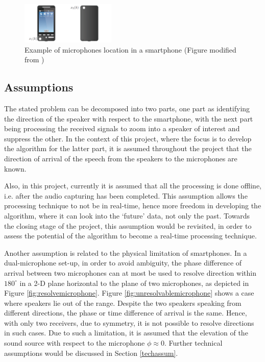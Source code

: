 \documentclass[a4paper,twoside,12pt,hidelinks]{article}
\begin{document}
\begin{figure}[H]
\centering
\includegraphics[width=0.4\textwidth]{mobilephone}
\caption{Example of microphones location in a smartphone (Figure modified from \cite{Jeub2012NoiseDifferences})}
\label{fig:mobilephone}
\end{figure}

\subsection{Assumptions}
The stated problem can be decomposed into two parts, one part as identifying the direction of the speaker with respect to the smartphone, with the next part being processing the received signals to zoom into a speaker of interest and suppress the other. In the context of this project, where the focus is to develop the algorithm for the latter part, it is assumed throughout the project that the direction of arrival of the speech from the speakers to the microphones are known.

Also, in this project, currently it is assumed that all the processing is done offline, i.e. after the audio capturing has been completed. This assumption allows the processing technique to not be in real-time, hence more freedom in developing the algorithm, where it can look into the `future' data, not only the past. Towards the closing stage of the project, this assumption would be revisited, in order to assess the potential of the algorithm to become a real-time processing technique.

Another assumption is related to the physical limitation of smartphones. In a dual-microphone set-up, in order to avoid ambiguity, the phase difference of arrival between two microphones can at most be used to resolve direction within $180^{\circ}$ in a 2-D plane horizontal to the plane of two microphones, as depicted in Figure \ref{fig:resolvemicrophone}. Figure \ref{fig:unresolvablemicrophone} shows a case where speakers lie out of the range. Despite the two speakers speaking from different directions, the phase or time difference of arrival is the same. Hence, with only two receivers, due to symmetry, it is not possible to resolve directions in such cases. Due to such a limitation, it is assumed that the elevation of the sound source with respect to the microphone $\phi \approx 0$. Further technical assumptions would be discussed in Section \ref{techassum}.
\end{document}
